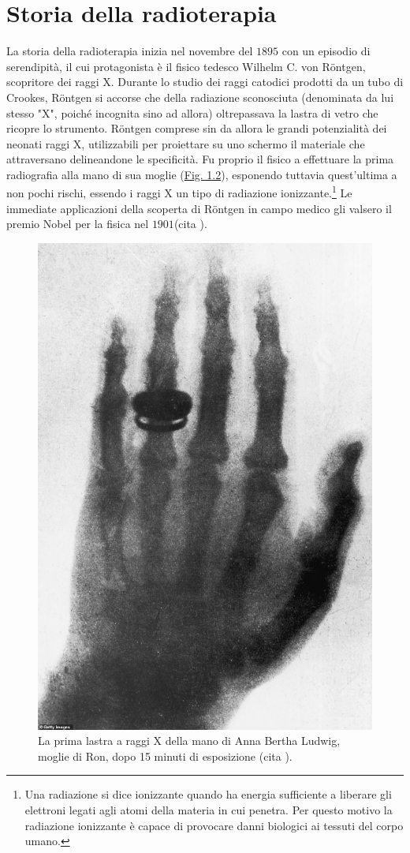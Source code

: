 \documentclass[12pt,a4paper,twoside]{report}
\begin{document}
	\section{Storia della radioterapia}
	La storia della radioterapia inizia nel novembre del $1895$ con un episodio di serendipità, il cui protagonista è il fisico tedesco Wilhelm C. von Röntgen, scopritore dei raggi X. Durante lo studio dei raggi catodici prodotti da un tubo di Crookes, Röntgen si accorse che della radiazione sconosciuta (denominata da lui stesso "X", poiché incognita sino ad allora) oltrepassava la lastra di vetro che ricopre lo strumento. Röntgen comprese sin da allora le grandi potenzialità dei neonati raggi X, utilizzabili per proiettare su uno schermo il materiale che attraversano delineandone le specificità. Fu proprio il fisico a effettuare la prima radiografia alla mano di sua moglie (\hyperref[fig:rongten]{Fig. 1.2}), esponendo tuttavia quest'ultima a non pochi rischi, essendo i raggi X un tipo di radiazione ionizzante.\footnote{Una radiazione si dice ionizzante quando ha energia sufficiente a liberare gli elettroni legati agli atomi della materia in cui penetra. Per questo motivo la radiazione ionizzante è capace di provocare danni biologici ai tessuti del corpo umano.} Le immediate applicazioni della scoperta di Röntgen in campo medico gli valsero il premio Nobel per la fisica nel $1901$(cita
	).
	
	\begin{figure}[H]
		\centering
		\includegraphics[width=0.5\linewidth]{images/rongten.jpg}
		\caption{La prima lastra a raggi X della mano di Anna Bertha Ludwig, moglie di Ron, dopo 15 minuti di esposizione (cita
			).}
		\label{fig:rongten}
	\end{figure}
	
\end{document}
